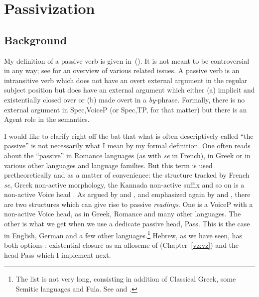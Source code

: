 \section{Passivization} \label{passn:pass}
	\subsection{Background}
My definition of a passive verb is given in~(\nextx). It is not meant to be controversial in any way; see \cite{williams15} for an overview of various related issues.
\pex
	\a A passive verb is an intransitive verb which does not have an overt external argument in the regular subject position but does have an external argument which either (a) implicit and existentially closed over or (b) made overt in a \emph{by}-phrase.
	\a Formally, there is no external argument in Spec,VoiceP (or Spec,TP, for that matter) but there is an Agent role in the semantics.
\xe

I would like to clarify right off the bat that what is often descriptively called ``the passive'' is not necessarily what I mean by my formal definition. One often reads about the ``passive'' in Romance languages (as with \emph{se} in French), in Greek or in various other languages and language families. But this term is used pretheoretically and as a matter of convenience: the structure tracked by French \emph{se}, Greek non-active morphology, the Kannada non-active suffix \citep{lidz01} and so on is a non-active Voice head \cite{lidz01,labelle08,schaefer17oup}. As argued by \cite{alexiadoudoron12} and \citet[123]{layering15}, and emphasized again by \cite{spathasetal15} and \cite{kastnerzu17}, there are two structures which can give rise to passive \emph{readings}. One is a VoiceP with a non-active Voice head, as in Greek, Romance and many other languages. The other is what we get when we use a dedicate passive head, Pass. This is the case in English, German and a few other languages.\footnote{The list is not very long, consisting in addition of Classical Greek, some Semitic languages and Fula. See \cite{klaiman91} and \cite{alexiadoudoron12}.} Hebrew, as we have seen, has both options \citep{alexiadoudoron12}: existential closure as an alloseme of {\vz} (Chapter~\ref{vz:vz}) and the head Pass which I implement next.

